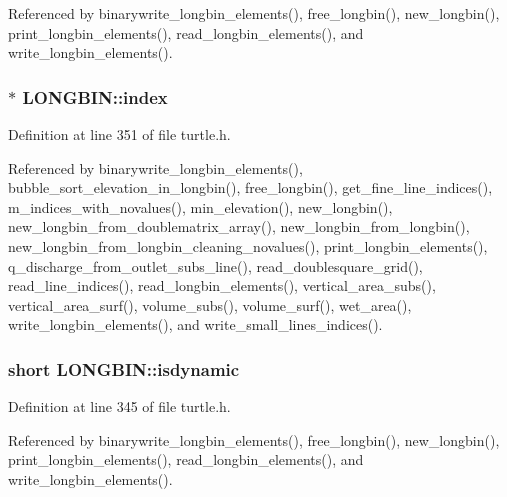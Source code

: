 Referenced by binarywrite\-\_\-longbin\-\_\-elements(), free\-\_\-longbin(), new\-\_\-longbin(), print\-\_\-longbin\-\_\-elements(), read\-\_\-longbin\-\_\-elements(), and write\-\_\-longbin\-\_\-elements().

\hypertarget{struct_l_o_n_g_b_i_n_a9530c720bca43d9e00d52cbe306a43cc}{
\subsubsection[{index}]{$\ast$ L\-O\-N\-G\-B\-I\-N\-::index}}\label{struct_l_o_n_g_b_i_n_a9530c720bca43d9e00d52cbe306a43cc}


Definition at line 351 of file turtle.\-h.



Referenced by binarywrite\-\_\-longbin\-\_\-elements(), bubble\-\_\-sort\-\_\-elevation\-\_\-in\-\_\-longbin(), free\-\_\-longbin(), get\-\_\-fine\-\_\-line\-\_\-indices(), m\-\_\-indices\-\_\-with\-\_\-novalues(), min\-\_\-elevation(), new\-\_\-longbin(), new\-\_\-longbin\-\_\-from\-\_\-doublematrix\-\_\-array(), new\-\_\-longbin\-\_\-from\-\_\-longbin(), new\-\_\-longbin\-\_\-from\-\_\-longbin\-\_\-cleaning\-\_\-novalues(), print\-\_\-longbin\-\_\-elements(), q\-\_\-discharge\-\_\-from\-\_\-outlet\-\_\-subs\-\_\-line(), read\-\_\-doublesquare\-\_\-grid(), read\-\_\-line\-\_\-indices(), read\-\_\-longbin\-\_\-elements(), vertical\-\_\-area\-\_\-subs(), vertical\-\_\-area\-\_\-surf(), volume\-\_\-subs(), volume\-\_\-surf(), wet\-\_\-area(), write\-\_\-longbin\-\_\-elements(), and write\-\_\-small\-\_\-lines\-\_\-indices().

\hypertarget{struct_l_o_n_g_b_i_n_aff95fcc6c60230a52c73027909b35be7}{
\subsubsection[{isdynamic}]{\setlength{\rightskip}{0pt plus 5cm}short L\-O\-N\-G\-B\-I\-N\-::isdynamic}}\label{struct_l_o_n_g_b_i_n_aff95fcc6c60230a52c73027909b35be7}


Definition at line 345 of file turtle.\-h.



Referenced by binarywrite\-\_\-longbin\-\_\-elements(), free\-\_\-longbin(), new\-\_\-longbin(), print\-\_\-longbin\-\_\-elements(), read\-\_\-longbin\-\_\-elements(), and write\-\_\-longbin\-\_\-elements().

